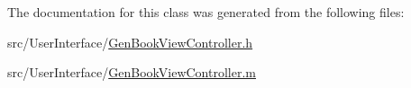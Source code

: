 The documentation for this class was generated from the following files\-:\begin{DoxyCompactItemize}
\item 
src/\-User\-Interface/\hyperlink{_gen_book_view_controller_8h}{Gen\-Book\-View\-Controller.\-h}\item 
src/\-User\-Interface/\hyperlink{_gen_book_view_controller_8m}{Gen\-Book\-View\-Controller.\-m}\end{DoxyCompactItemize}
